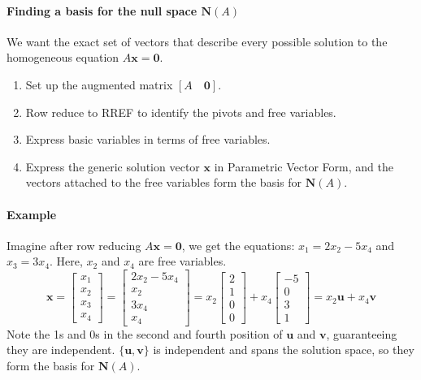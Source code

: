\documentclass[../linear-algebra.tex]{subfiles}
\begin{document}
\paragraph{Finding a basis for the null space $\mathbf{N}(A)$}
We want the exact set of vectors that describe every possible solution to the homogeneous equation $A\textbf{x} = \textbf{0}$.
\begin{enumerate}
    \item Set up the augmented matrix $[A \quad \textbf{0}]$.
    \item Row reduce to RREF to identify the pivots and free variables.
    \item Express basic variables in terms of free variables.
    \item Express the generic solution vector $\mathbf{x}$ in Parametric Vector Form, and the vectors attached to the free variables form the basis for $\mathbf{N}(A)$.
\end{enumerate}
\paragraph{Example} Imagine after row reducing $A\textbf{x} = \textbf{0}$, we get the equations:
$x_1 = 2x_2 - 5x_4$ and $x_3 = 3x_4$.
Here, $x_2$ and $x_4$ are free variables.
$$\textbf{x} = \begin{bmatrix} x_1 \\ x_2 \\ x_3 \\ x_4 \end{bmatrix} = \begin{bmatrix} 2x_2 - 5x_4 \\ x_2 \\ 3x_4 \\ x_4 \end{bmatrix} = x_2 \begin{bmatrix} 2 \\ 1 \\ 0 \\ 0 \end{bmatrix} + x_4 \begin{bmatrix} -5 \\ 0 \\ 3 \\ 1 \end{bmatrix} = x_2\textbf{u} + x_4\textbf{v}$$
Note the 1s and 0s in the second and fourth position of $\mathbf{u}$ and $\mathbf{v}$, guaranteeing they are independent.\newline
$\{\mathbf{u}, \mathbf{v}\}$ is independent and spans the solution space, so they form the basis for $\mathbf{N}(A)$.
\end{document}

